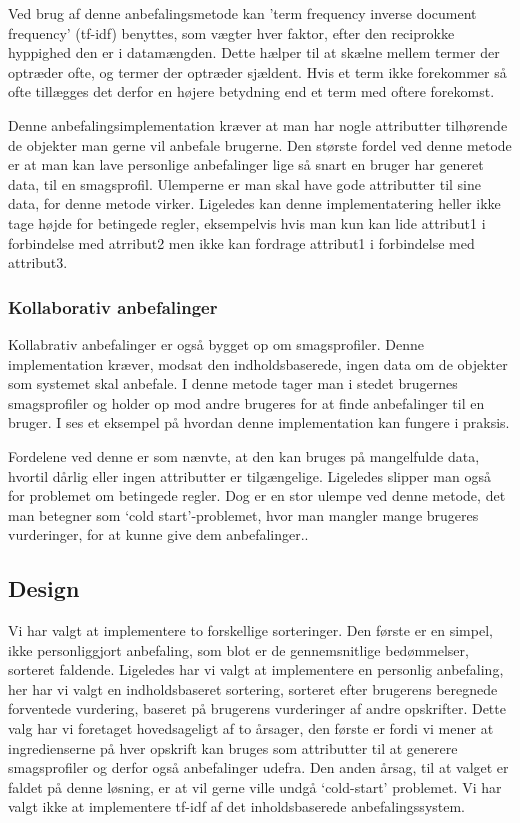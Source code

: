 Ved brug af denne anbefalingsmetode kan 'term frequency inverse document frequency' (tf-idf) benyttes, som vægter hver faktor, efter den reciprokke hyppighed den er i datamængden.
Dette hælper til at skælne mellem termer der optræder ofte, og termer der optræder sjældent.
Hvis et term ikke forekommer så ofte tillægges det derfor en højere betydning end et term med oftere forekomst.

Denne anbefalingsimplementation kræver at man har nogle attributter tilhørende de objekter man gerne vil anbefale brugerne.
Den største fordel ved denne metode  er at man kan lave personlige anbefalinger lige så snart en bruger har generet data, til en smagsprofil.
Ulemperne er man skal have gode attributter til sine data, for denne metode virker. 
Ligeledes kan denne implementatering heller ikke tage højde for betingede regler, eksempelvis hvis man kun kan lide attribut1 i forbindelse med atrribut2 men ikke kan fordrage attribut1 i forbindelse med attribut3.

\subsubsection{Kollaborativ anbefalinger}
Kollabrativ anbefalinger er også bygget op om smagsprofiler.
Denne implementation kræver, modsat den indholdsbaserede, ingen data om de objekter som systemet skal anbefale. 
I denne metode tager man i stedet brugernes smagsprofiler og holder op mod andre brugeres for at finde anbefalinger til en bruger.
I  ses et eksempel på hvordan denne implementation kan fungere i praksis.

Fordelene ved denne er som nænvte, at den kan bruges på mangelfulde data, hvortil dårlig eller ingen attributter er tilgængelige.
Ligeledes slipper man også for problemet om betingede regler.
Dog er en stor ulempe ved denne metode, det man betegner som ‘cold start’-problemet, hvor man mangler mange brugeres vurderinger, for at kunne give dem anbefalinger.\citep{RecommenderSystems}.


\subsection{Design}
Vi har valgt at implementere to forskellige sorteringer.
Den første er en simpel, ikke personliggjort anbefaling, som blot er de gennemsnitlige bedømmelser, sorteret faldende.
Ligeledes har vi valgt at implementere en personlig anbefaling, her har vi valgt en indholdsbaseret sortering, sorteret efter brugerens beregnede forventede vurdering, baseret på brugerens vurderinger af andre opskrifter.
Dette valg har vi foretaget hovedsageligt af to årsager, den første er fordi vi mener at ingredienserne på hver opskrift kan bruges som attributter til at generere smagsprofiler og derfor også anbefalinger udefra.
Den anden årsag, til at valget er faldet på denne løsning, er at vil gerne ville undgå ‘cold-start’ problemet.
Vi har valgt ikke at implementere tf-idf af det inholdsbaserede anbefalingssystem.


